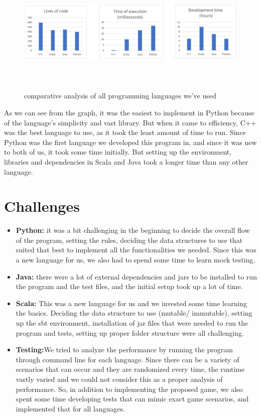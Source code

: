 \documentclass[12pt]{article}
\begin{document}
\begin{figure}[h] 
\centering
\includegraphics[height=6cm, width=18cm]{comp.png}
\caption{comparative analysis of all programming languages we've used}
\end{figure}

As we can see from the graph, it was the easiest to implement in Python because of the language's simplicity and vast library. But when it came to efficiency, C++ was the best language to use, as it took the least amount of time to run. Since Python was the first language we developed this program in, and since it was new to both of us, it took some time initially. But setting up the environment, libraries and dependencies in Scala and Java took a longer time than any other language.

\section{Challenges}

\begin{itemize}
    \item \textbf{Python:} it was a bit challenging in the beginning to decide the overall flow of the program, setting the rules, deciding the data structures to use that suited that best to implement all the functionalities we needed. Since this was a new language for us, we also had to spend some time to learn mock testing. 
    \item \textbf{Java:} there were a lot of external dependencies and jars to be installed to run the program and the test files, and the initial setup took up a lot of time.
    \item \textbf{Scala:} This was a new language for us and we invested some time learning the basics. Deciding the data structure to use (mutable/ immutable),  setting up the sbt environment, installation of jar files that were needed to run the program and tests, setting up proper folder structure were all challenging.
    \item \textbf{Testing:}We tried to analyze the performance by running the program through command line for each language. Since there can be a variety of scenarios that can occur and they are randomized every time, the runtime vastly varied and we could not consider this as a proper analysis of performance. So, in addition to implementing the proposed game, we also spent some time developing tests that can mimic exact game scenarios, and implemented that for all languages.
\end{itemize}
\end{document}
